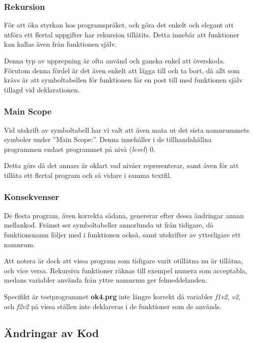 		\subsubsection{Rekursion}
		
			För att öka styrkan hos programspråket, och göra det enkelt och elegant att utföra ett flertal uppgifter har rekursion tillåtits. Detta innebär att funktioner kan kallas även från funktionen själv.
			
			Denna typ av upprepning är ofta använd och ganska enkel att överskoda. Förutom denna fördel är det även enkelt att lägga till och ta bort, då allt som krävs är att symboltabellen för funktionen får en post till med funktionen själv tillagd vid deklarationen.
			
		
		\subsubsection{Main Scope}
		
			Vid utskrift av symboltabell har vi valt att även mata ut det sista namnrummets symboler under ''Main Scope:''. Denna innehåller i de tillhandahållna programmen endast programmet på nivå (\textit{level}) 0.
			
			Detta görs då det annars är oklart vad nivåer representerar, samt även för att tillåta ett flertal program och så vidare i samma textfil.

		\subsubsection{Konsekvenser}
			
			De flesta program, även korrekta sådana, genererar efter dessa ändringar annan mellankod. Främst ser symboltabeller annorlunda ut från tidigare, då funktionsnamn följer med i funktionen också, samt utskrifter av ytterligare ett namnrum.
			
			Att notera är dock att vissa program som tidigare varit otillåtna nu är tillåtna, och vice versa. Rekursiva funktioner räknas till exempel numera som acceptabla, medans variabler använda från yttre namnrum ger felmeddelanden.
			
			Specifikt är testprogrammet \textbf{ok4.prg} inte längre korrekt då variabler \textit{f1v2}, \textit{v2}, och \textit{f2v2} på vissa ställen inte deklareras i de funktioner som de används.
			

	\subsection{Ändringar av Kod}

